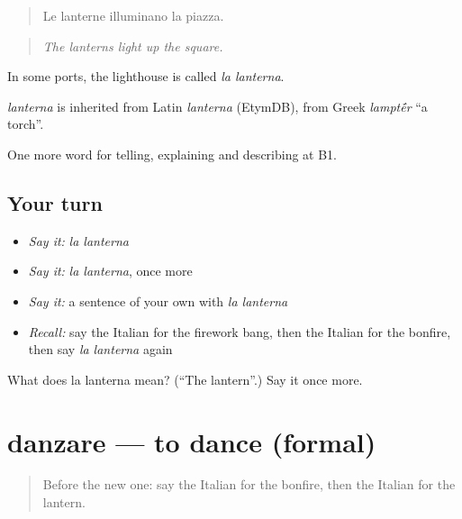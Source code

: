 \begin{quote}
Le lanterne illuminano la piazza.
\end{quote}

\begin{quote}
\emph{The lanterns light up the square.}
\end{quote}

In some ports, the lighthouse is called \emph{la lanterna}.

\begin{cousinweb}
\emph{lanterna} is inherited from Latin \emph{lanterna} (EtymDB), from Greek \emph{lampt\'{\={e}}r} \textquotedblleft{}a torch\textquotedblright{}.
\end{cousinweb}

\begin{grammarlens}[title={What you've built}]
One more word for telling, explaining and describing at B1.
\end{grammarlens}

\subsection*{Your turn}
\begin{itemize}
\raggedright
  \item \emph{Say it:} \emph{la lanterna}
  \item \emph{Say it:} \emph{la lanterna}, once more
  \item \emph{Say it:} a sentence of your own with \emph{la lanterna}
  \item \emph{Recall:} say the Italian for the firework bang, then the Italian for the bonfire, then say \emph{la lanterna} again
\end{itemize}

\begin{tcolorbox}[breakable,colback=teal!4,colframe=teal!35!black,title={Before you move on}]
What does la lanterna mean? (\textquotedblleft{}The lantern\textquotedblright{}.) Say it once more.
\end{tcolorbox}
\section[danzare]{danzare — to dance (formal)}

\label{lesson:IT-C322-danzare}



\begin{quote}
Before the new one: say the Italian for the bonfire, then the Italian for the lantern.
\end{quote}

